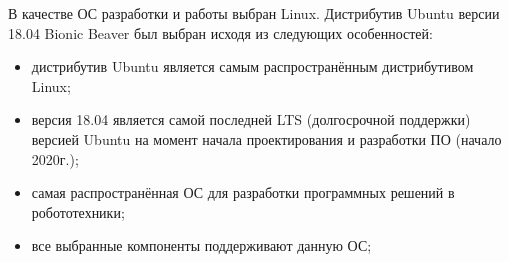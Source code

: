 \documentclass[specification,annotation]{itmo-student-thesis}
\begin{document}
В качестве ОС разработки и работы выбран Linux. Дистрибутив Ubuntu версии 18.04
Bionic Beaver был выбран исходя из следующих особенностей:

\begin{itemize}
  \item дистрибутив Ubuntu является самым распространённым дистрибутивом Linux;
  \item версия 18.04 является самой последней LTS (долгосрочной
    поддержки) версией Ubuntu на момент начала проектирования и разработки ПО
    (начало 2020г.);
  \item самая распространённая ОС для разработки программных решений в
    робототехники;
  \item все выбранные компоненты поддерживают данную ОС;
\end{itemize}
\end{document}
